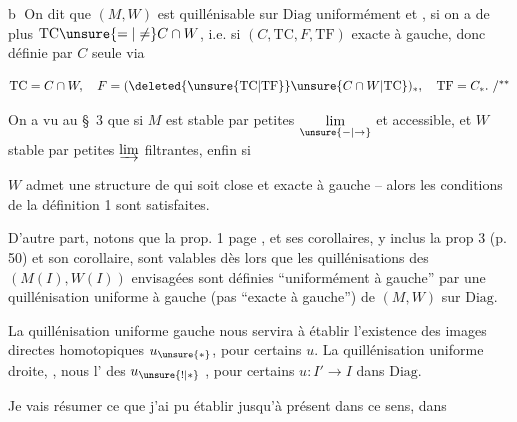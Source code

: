 \textcircled{b} On dit que $(M,W)$ est quillénisable sur $\mathrm{Diag}$ uniformément et  , si on  a de plus $\mathrm{TC}\unsure{=|\ne}C\cap W$, i.e. si $(C,\mathrm{TC},F,\mathrm{TF})$  exacte à gauche, donc définie par $C$ seule via

\[ \mathrm{TC}=C\cap W,\quad F=(\deleted{\unsure{\mathrm{TC}|\mathrm{TF}}}\unsure{C\cap W|\mathrm{TC}})_*,\quad \mathrm{TF}=C_*.\ /{}^{**} \]



On a vu au \S~3 que si $M$ est  stable par petites $\underset{\unsure{-|\to}}{\lim}$ et accessible, et $W$ stable par petites $\varinjlim$ filtrantes, enfin si

$W$ admet une structure de   qui soit close et exacte à gauche -- alors les conditions de la définition 1 sont satisfaites. 

D'autre part, notons que la prop. 1 page , et ses corollaires, y inclus la prop 3 (p. 50) et son corollaire, sont  valables dès lors que les quillénisations des $(M(I),W(I))$ envisagées sont définies ``uniformément à gauche'' par une quillénisation uniforme à gauche (pas  ``exacte à gauche'') de $(M,W)$ sur $\mathrm{Diag}$.

La quillénisation uniforme gauche nous servira à établir l'existence des images directes homotopiques $u_{\unsure{*}}$, pour certains $u$. La quillénisation uniforme droite, ,  nous   l' des $u_{\unsure{!|*}}$ , pour certains $u:I'\to I$ dans $\mathrm{Diag}$.

Je vais résumer ce que j'ai pu établir jusqu'à présent dans ce sens, dans 
